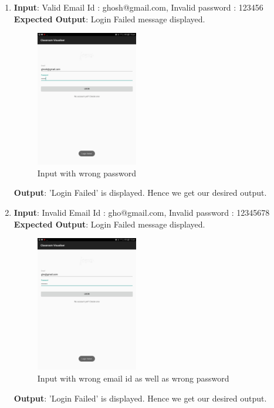\documentclass{scrreprt}
\begin{document}
\begin{itemize}
\begin{enumerate}
\item \textbf{Input}: Valid Email Id : ghosh@gmail.com, Invalid password : 123456\\
\textbf{Expected Output}: Login Failed message displayed.
\begin{figure}[H]
\centering
\includegraphics[width=0.42\textwidth, keepaspectratio]{loginwrongpass.jpg}
\caption{Input with wrong password}
\end{figure}
\textbf{Output}: 'Login Failed' is displayed. Hence we get our desired output.


\item \textbf{Input}: Invalid Email Id : gho@gmail.com, Invalid password : 12345678\\
\textbf{Expected Output}: Login Failed message displayed.
\begin{figure}[H]
\centering
\includegraphics[width=0.42\textwidth, keepaspectratio]{loginwrongpassuser.jpg}
\caption{Input with wrong email id as well as wrong password}
\end{figure}
\textbf{Output}: 'Login Failed' is displayed. Hence we get our desired output.
\end{enumerate}
\end{itemize}
\end{document}

